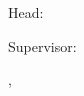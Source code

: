 
\begin{titlepage}


%

\begin{center}
~
\vfill\vfill\vfill

\myauthor

\vfill

{\LARGE\bfseries\mytitle}

\vfill\vfill\vfill

{\bfseries\myworktitle}

\vfill\vfill\vfill
\vfill\vfill\vfill
\vfill\vfill\vfill

\myuniversity

\vfill

\myinstitute\\
Head: \myinstitutehead\\

\vfill

Supervisor: \mysupervisor\\

\vfill

\mysubmissiontown, \mysubmissionmonth~\mysubmissionyear

\end{center}
\end{titlepage}

\newpage

